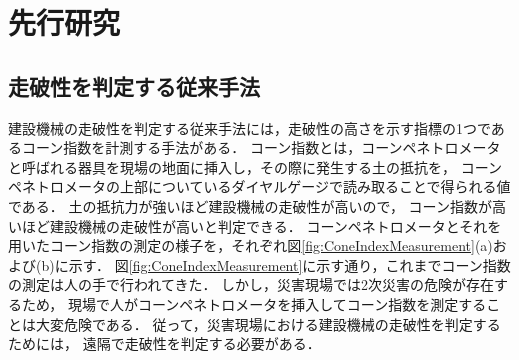 \clearpage


\section{先行研究}\label{sec:PreviousStudy}


\subsection{走破性を判定する従来手法}\label{ssec:TraditionalMethod}

建設機械の走破性を判定する従来手法には，走破性の高さを示す指標の1つであるコーン指数を計測する手法がある\cite{Mulqueen1977}\cite{Perumpral1987}．
コーン指数とは，コーンペネトロメータと呼ばれる器具を現場の地面に挿入し，その際に発生する土の抵抗を，%
コーンペネトロメータの上部についているダイヤルゲージで読み取ることで得られる値である．
土の抵抗力が強いほど建設機械の走破性が高いので，
コーン指数が高いほど建設機械の走破性が高いと判定できる．
コーンペネトロメータとそれを用いたコーン指数の測定の様子を，それぞれ図\ref{fig:ConeIndexMeasurement}(a)および(b)に示す．
図\ref{fig:ConeIndexMeasurement}に示す通り，これまでコーン指数の測定は人の手で行われてきた．
しかし，災害現場では2次災害の危険が存在するため，
現場で人がコーンペネトロメータを挿入してコーン指数を測定することは大変危険である．
従って，災害現場における建設機械の走破性を判定するためには，
遠隔で走破性を判定する必要がある．

